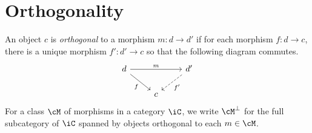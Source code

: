 \documentclass[article,10pt,oneside]{memoir}
\begin{document}
\section{Orthogonality}
\label{sec:orthogonality}

\begin{defn}
  An object $c$ is \emph{orthogonal} to a morphism $m : d \to d'$ if for each morphism $f : d \to c$, there is a unique morphism $f' : d' \to c$ so that the following diagram commutes.
  \[\begin{tikzcd}
      d && {d'} \\
      & c
      \arrow["m", from=1-1, to=1-3]
      \arrow["f"', from=1-1, to=2-2]
      \arrow["{f'}", dashed, from=1-3, to=2-2]
    \end{tikzcd}\]
  For a class $\cM$ of morphisms in a category $\iC$, we write $\cM^{\bot}$ for the full subcategory of $\iC$ spanned by objects orthogonal to each $m \in \cM$.
\end{defn}
\end{document}
